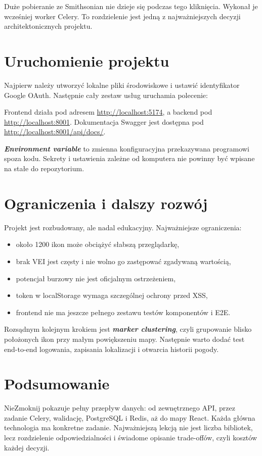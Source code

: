 \documentclass[14pt,a5paper,oneside]{extarticle}
\newcommand{\term}[1]{\textbf{\textit{#1}}}
\newcommand{\code}[1]{\texttt{\detokenize{#1}}}
\begin{document}
Duże pobieranie ze Smithsonian nie dzieje się podczas tego kliknięcia.
Wykonał je wcześniej worker Celery. To rozdzielenie jest jedną z
najważniejszych decyzji architektonicznych projektu.

\section{Uruchomienie projektu}

Najpierw należy utworzyć lokalne pliki środowiskowe i ustawić identyfikator
Google OAuth. Następnie cały zestaw usług uruchamia polecenie:

\begin{center}
\code{docker compose up --build}
\end{center}

Frontend działa pod adresem \url{http://localhost:5174}, a backend pod
\url{http://localhost:8001}. Dokumentacja Swagger jest dostępna pod
\url{http://localhost:8001/api/docs/}.

\term{Environment variable} to zmienna konfiguracyjna przekazywana programowi
spoza kodu. Sekrety i ustawienia zależne od komputera nie powinny być wpisane
na stałe do repozytorium.

\section{Ograniczenia i dalszy rozwój}

Projekt jest rozbudowany, ale nadal edukacyjny. Najważniejsze ograniczenia:

\begin{itemize}
  \item około 1200 ikon może obciążyć słabszą przeglądarkę,
  \item brak VEI jest częsty i nie wolno go zastępować zgadywaną wartością,
  \item potencjał burzowy nie jest oficjalnym ostrzeżeniem,
  \item token w localStorage wymaga szczególnej ochrony przed XSS,
  \item frontend nie ma jeszcze pełnego zestawu testów komponentów i E2E.
\end{itemize}

Rozsądnym kolejnym krokiem jest \term{marker clustering}, czyli grupowanie
blisko położonych ikon przy małym powiększeniu mapy. Następnie warto dodać
test end-to-end logowania, zapisania lokalizacji i otwarcia historii pogody.

\section{Podsumowanie}

NieZmoknij pokazuje pełny przepływ danych: od zewnętrznego API,
przez zadanie Celery, walidację, PostgreSQL i Redis, aż do mapy React.
Każda główna technologia ma konkretne zadanie. Najważniejszą lekcją nie jest
liczba bibliotek, lecz rozdzielenie odpowiedzialności i świadome opisanie
trade-offów, czyli kosztów każdej decyzji.
\end{document}
